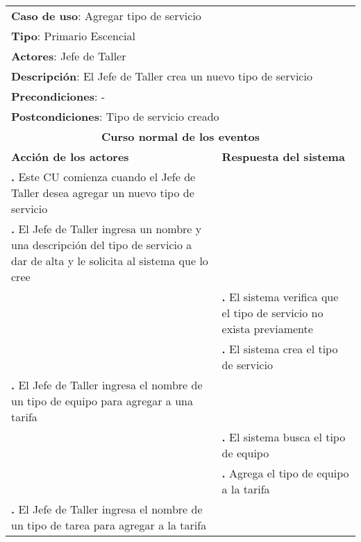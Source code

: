 \documentclass[12pt]{extarticle}
\begin{document}
    \newcommand\inc{\stepcounter{step}\textbf{\thestep. }}
    \newcommand\resetinc{\setcounter{step}{0}}
    \newcommand\raya{\noindent\rule{169mm}{0.8mm}\\}


	\begin{longtable}{ |p{8cm}|p{8cm}| }
		\hline
		\multicolumn{2}{|p{16cm}|}{\textbf{Caso de uso}: Agregar tipo de servicio}\\
		\multicolumn{2}{|p{16cm}|}{\textbf{Tipo}: Primario Escencial}\\
		\multicolumn{2}{|p{16cm}|}{\textbf{Actores}: Jefe de Taller}\\
		\multicolumn{2}{|p{16cm}|}{\textbf{Descripción}: El Jefe de Taller crea un nuevo tipo de servicio}\\
		\multicolumn{2}{|p{16cm}|}{\textbf{Precondiciones}: -}\\
		\multicolumn{2}{|p{16cm}|}{\textbf{Postcondiciones}: Tipo de servicio creado}\\
		\hline
		\multicolumn{2}{|c|}{\textbf{Curso normal de los eventos}}\\
		\hline
		\textbf{Acción de los actores} & \textbf{Respuesta del sistema}\\
		\hline
			\inc Este CU comienza cuando el Jefe de Taller desea agregar un nuevo tipo de servicio & \\
			\hline
            \inc  El Jefe de Taller ingresa un nombre y una descripción del tipo de servicio a dar de alta y le solicita al sistema que lo cree & \\
			\hline
            & \inc El sistema verifica que el tipo de servicio no exista previamente \\
			\hline
			& \inc El sistema crea el tipo de servicio \\
			\hline


			\inc El Jefe de Taller ingresa el nombre de un tipo de equipo para agregar a una tarifa& \\
			\hline
			& \inc El sistema busca el tipo de equipo \\
			\hline
            & \inc Agrega el tipo de equipo a la tarifa \\
			\hline
            \inc El Jefe de Taller ingresa el nombre de un tipo de tarea para agregar a la tarifa&\\
			\hline



\end{longtable}
\end{document}
